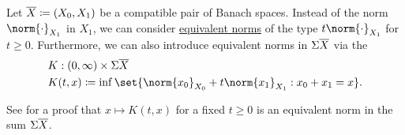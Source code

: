 \begin{definition}\label{def:k_functional}
  Let \( \oline{X} \coloneqq ( X_0, X_1 ) \) be a compatible pair of Banach spaces. Instead of the norm \( \norm{\cdot}_{X_1} \) in \( X_1 \), we can consider \hyperref[def:equivalent_metrics]{equivalent norms} of the type \( t\norm{\cdot}_{X_1} \) for \( t \geq 0 \). Furthermore, we can also introduce equivalent norms in \( \Sigma \oline{X} \) via the 
  \begin{equation}\label{eq:def:k_functional}
    \begin{aligned}
      &K: (0, \infty) \times {\Sigma \oline{X}} \\
      &K(t, x) \coloneqq \inf \set{ \norm{x_0}_{X_0} + t\norm{x_1}_{X_1} : x_0 + x_1 = x }.
    \end{aligned}
  \end{equation}

  See  for a proof that \( x \mapsto K(t, x) \) for a fixed \( t \geq 0 \) is an equivalent norm in the sum \( \Sigma \oline{X} \).
\end{definition}

